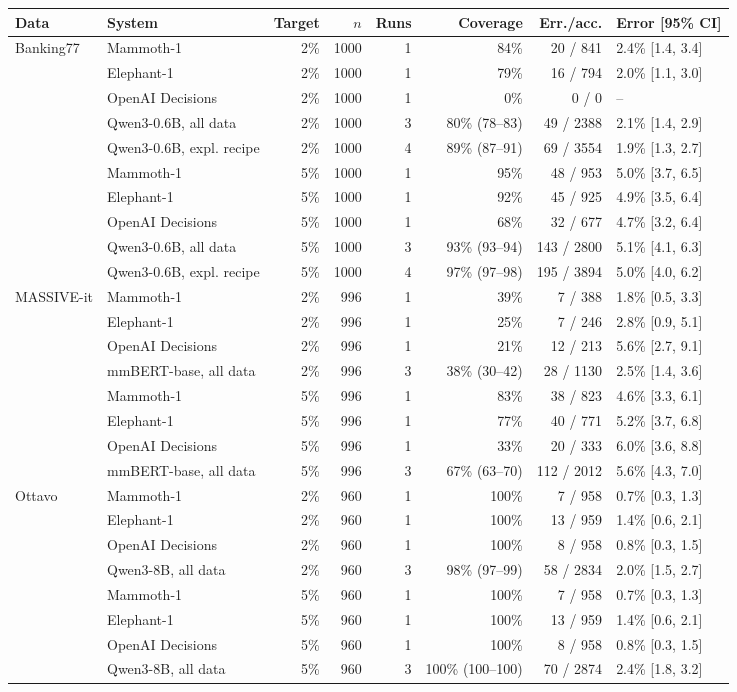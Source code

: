 \begin{tabular}{llrrrrrl}
\toprule
Data & System & Target & $n$ & Runs & Coverage & Err./acc. & Error [95\% CI] \\
\midrule
Banking77 & Mammoth-1 & 2\% & 1000 & 1 & 84\% & 20 / 841 & 2.4\% [1.4, 3.4] \\
 & Elephant-1 & 2\% & 1000 & 1 & 79\% & 16 / 794 & 2.0\% [1.1, 3.0] \\
 & OpenAI Decisions & 2\% & 1000 & 1 & 0\% & 0 / 0 & -- \\
 & Qwen3-0.6B, all data & 2\% & 1000 & 3 & 80\% (78--83) & 49 / 2388 & 2.1\% [1.4, 2.9] \\
 & Qwen3-0.6B, expl. recipe & 2\% & 1000 & 4 & 89\% (87--91) & 69 / 3554 & 1.9\% [1.3, 2.7] \\
 & Mammoth-1 & 5\% & 1000 & 1 & 95\% & 48 / 953 & 5.0\% [3.7, 6.5] \\
 & Elephant-1 & 5\% & 1000 & 1 & 92\% & 45 / 925 & 4.9\% [3.5, 6.4] \\
 & OpenAI Decisions & 5\% & 1000 & 1 & 68\% & 32 / 677 & 4.7\% [3.2, 6.4] \\
 & Qwen3-0.6B, all data & 5\% & 1000 & 3 & 93\% (93--94) & 143 / 2800 & 5.1\% [4.1, 6.3] \\
 & Qwen3-0.6B, expl. recipe & 5\% & 1000 & 4 & 97\% (97--98) & 195 / 3894 & 5.0\% [4.0, 6.2] \\
\midrule
MASSIVE-it & Mammoth-1 & 2\% & 996 & 1 & 39\% & 7 / 388 & 1.8\% [0.5, 3.3] \\
 & Elephant-1 & 2\% & 996 & 1 & 25\% & 7 / 246 & 2.8\% [0.9, 5.1] \\
 & OpenAI Decisions & 2\% & 996 & 1 & 21\% & 12 / 213 & 5.6\% [2.7, 9.1] \\
 & mmBERT-base, all data & 2\% & 996 & 3 & 38\% (30--42) & 28 / 1130 & 2.5\% [1.4, 3.6] \\
 & Mammoth-1 & 5\% & 996 & 1 & 83\% & 38 / 823 & 4.6\% [3.3, 6.1] \\
 & Elephant-1 & 5\% & 996 & 1 & 77\% & 40 / 771 & 5.2\% [3.7, 6.8] \\
 & OpenAI Decisions & 5\% & 996 & 1 & 33\% & 20 / 333 & 6.0\% [3.6, 8.8] \\
 & mmBERT-base, all data & 5\% & 996 & 3 & 67\% (63--70) & 112 / 2012 & 5.6\% [4.3, 7.0] \\
\midrule
Ottavo & Mammoth-1 & 2\% & 960 & 1 & 100\% & 7 / 958 & 0.7\% [0.3, 1.3] \\
 & Elephant-1 & 2\% & 960 & 1 & 100\% & 13 / 959 & 1.4\% [0.6, 2.1] \\
 & OpenAI Decisions & 2\% & 960 & 1 & 100\% & 8 / 958 & 0.8\% [0.3, 1.5] \\
 & Qwen3-8B, all data & 2\% & 960 & 3 & 98\% (97--99) & 58 / 2834 & 2.0\% [1.5, 2.7] \\
 & Mammoth-1 & 5\% & 960 & 1 & 100\% & 7 / 958 & 0.7\% [0.3, 1.3] \\
 & Elephant-1 & 5\% & 960 & 1 & 100\% & 13 / 959 & 1.4\% [0.6, 2.1] \\
 & OpenAI Decisions & 5\% & 960 & 1 & 100\% & 8 / 958 & 0.8\% [0.3, 1.5] \\
 & Qwen3-8B, all data & 5\% & 960 & 3 & 100\% (100--100) & 70 / 2874 & 2.4\% [1.8, 3.2] \\
\bottomrule
\end{tabular}